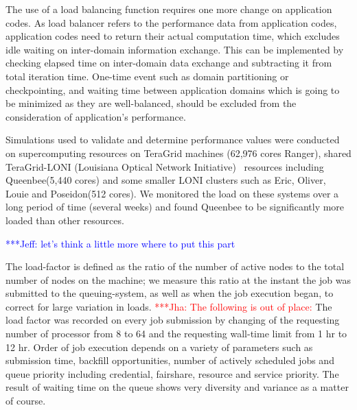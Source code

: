 \documentclass[conference,final]{IEEEtran}
\newcommand{\jhanote}[1]{ {\textcolor{red} { ***Jha: #1 }}}
\newcommand{\skonote}[1]{ {\textcolor{blue} { ***Jeff: #1 }}}
\newcommand{\jhanote}[1]{}
\newcommand{\skonote}[1]{}
\begin{document}
The use of a load balancing function requires one more change on
application codes. As load balancer refers to the performance data
from application codes, application codes need to return their actual
computation time, which excludes idle waiting on inter-domain
information exchange. This can be implemented by checking elapsed time
on inter-domain data exchange and subtracting it from total iteration
time.
One-time event such as domain partitioning or checkpointing, and
waiting time between application domains which is going to be
minimized as they are well-balanced, should be excluded from the
consideration of application's performance.


Simulations used to validate and determine performance values were
conducted on supercomputing resources on TeraGrid machines (62,976
cores Ranger), shared TeraGrid-LONI (Louisiana Optical Network
Initiative)~\cite{LONI_web} resources including Queenbee(5,440 cores)
and some smaller LONI clusters such as Eric, Oliver, Louie and
Poseidon(512 cores).  We monitored the load on these systems over a
long period of time (several weeks) and found Queenbee to be
significantly more loaded than other resources.


\skonote{let's think a little more where to put this part}

The load-factor is defined as the ratio of the number of active nodes
to the total number of nodes on the machine; we measure this ratio at
the instant the job was submitted to the queuing-system, as well as
when the job execution began, to correct for large variation in loads.
\jhanote{The following is out of place:} The load factor was recorded
on every job submission by changing of the requesting number of
processor from 8 to 64 and the requesting wall-time limit from 1 hr to
12 hr. Order of job execution depends on a variety of parameters such
as submission time, backfill opportunities, number of actively
scheduled jobs and queue priority including credential, fairshare,
resource and service priority. The result of waiting
time on the queue shows very diversity and variance as a matter
of course.
\end{document}

